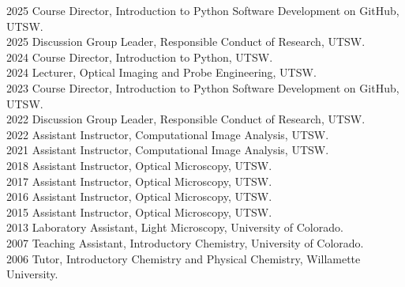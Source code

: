 2025 \hspace{58pt} Course Director, Introduction to Python Software Development on GitHub, UTSW. \\
2025 \hspace{58pt} Discussion Group Leader, Responsible Conduct of Research, UTSW. \\ 
2024 \hspace{58pt} Course Director, Introduction to Python, UTSW. \\
2024 \hspace{58pt} Lecturer, Optical Imaging and Probe Engineering, UTSW. \\
2023 \hspace{58pt} Course Director, Introduction to Python Software Development on GitHub, UTSW. \\
2022 \hspace{58pt} Discussion Group Leader, Responsible Conduct of Research, UTSW. \\ 
2022 \hspace{58pt} Assistant Instructor, Computational Image Analysis, UTSW. \\
2021 \hspace{58pt} Assistant Instructor, Computational Image Analysis, UTSW. \\
2018 \hspace{58pt} Assistant Instructor, Optical Microscopy, UTSW. \\
2017 \hspace{58pt} Assistant Instructor, Optical Microscopy, UTSW. \\
2016 \hspace{58pt} Assistant Instructor, Optical Microscopy, UTSW. \\
2015 \hspace{58pt} Assistant Instructor, Optical Microscopy, UTSW. \\
2013 \hspace{58pt} Laboratory Assistant, Light Microscopy, University of Colorado. \\
2007 \hspace{58pt} Teaching Assistant, Introductory Chemistry, University of Colorado.  \\
2006 \hspace{58pt} Tutor, Introductory Chemistry and Physical Chemistry, Willamette University. \\
\\ 
